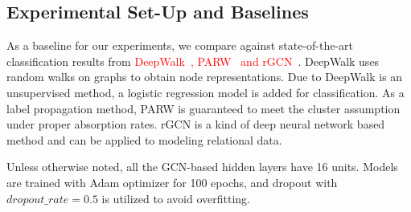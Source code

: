 \subsection{Experimental Set-Up and Baselines}
As a baseline for our experiments, we compare against state-of-the-art classification results from \textcolor{red}{DeepWalk~\cite{perozzi2014deepwalk}, PARW~\cite{wu2012learning} and rGCN~\cite{schlichtkrull2018modeling}}. DeepWalk uses random walks on graphs to obtain node representations. Due to DeepWalk is an unsupervised method, a logistic regression model is added for classification. As a label propagation method, PARW is guaranteed to meet the cluster assumption under proper absorption rates. rGCN is a kind of deep neural network based method and can be applied to modeling relational data. 

Unless otherwise noted, all the GCN-based hidden layers have 16 units. Models are trained with Adam optimizer for 100 epochs, and dropout with $dropout\_rate=0.5$ is utilized to avoid overfitting.

